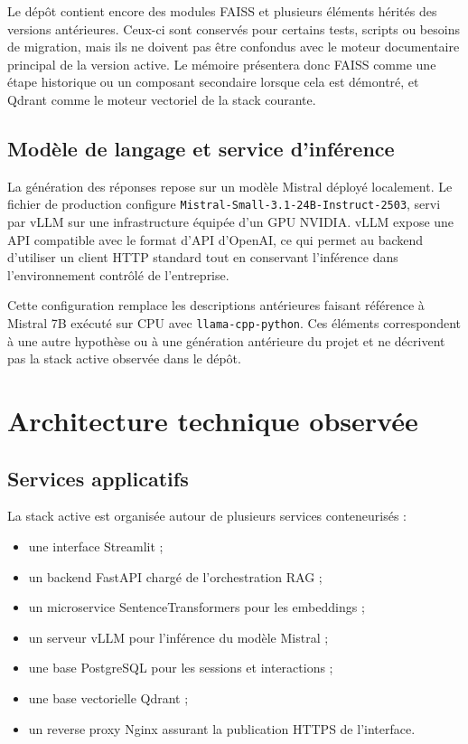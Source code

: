 Le dépôt contient encore des modules FAISS et plusieurs éléments hérités des versions antérieures. Ceux-ci sont conservés pour certains tests, scripts ou besoins de migration, mais ils ne doivent pas être confondus avec le moteur documentaire principal de la version active. Le mémoire présentera donc FAISS comme une étape historique ou un composant secondaire lorsque cela est démontré, et Qdrant comme le moteur vectoriel de la stack courante.

\subsection{Modèle de langage et service d'inférence}

La génération des réponses repose sur un modèle Mistral déployé localement. Le fichier de production configure \texttt{Mistral-Small-3.1-24B-Instruct-2503}, servi par vLLM sur une infrastructure équipée d'un GPU NVIDIA. vLLM expose une API compatible avec le format d'API d'OpenAI, ce qui permet au backend d'utiliser un client HTTP standard tout en conservant l'inférence dans l'environnement contrôlé de l'entreprise.

Cette configuration remplace les descriptions antérieures faisant référence à Mistral 7B exécuté sur CPU avec \texttt{llama-cpp-python}. Ces éléments correspondent à une autre hypothèse ou à une génération antérieure du projet et ne décrivent pas la stack active observée dans le dépôt.

\section{Architecture technique observée}

\subsection{Services applicatifs}

La stack active est organisée autour de plusieurs services conteneurisés :

\begin{itemize}
    \item une interface Streamlit ;
    \item un backend FastAPI chargé de l'orchestration RAG ;
    \item un microservice SentenceTransformers pour les embeddings ;
    \item un serveur vLLM pour l'inférence du modèle Mistral ;
    \item une base PostgreSQL pour les sessions et interactions ;
    \item une base vectorielle Qdrant ;
    \item un reverse proxy Nginx assurant la publication HTTPS de l'interface.
\end{itemize}

